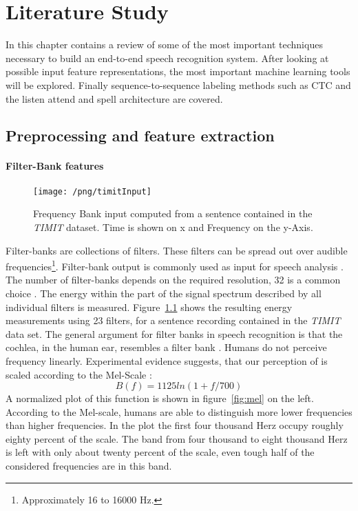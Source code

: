\chapter{Literature Study}
\label{cha:litreview}
In this chapter contains a review of some of the most important techniques necessary to build an end-to-end speech recognition system. After looking at possible input feature representations, the most important machine learning tools will be explored. Finally sequence-to-sequence labeling methods such as CTC and the listen attend and spell architecture are covered.

\section{Preprocessing and feature extraction}
\subsubsection{Filter-Bank features}
\begin{figure}
\centering
\texttt{[image: /png/timitInput]}
\caption{Frequency Bank input computed from a sentence contained in the \textit{TIMIT} dataset. Time is shown on x and Frequency on the y-Axis.}
\label{fig:timitInput}
\end{figure}
Filter-banks are collections of filters. These filters can be spread out over audible frequencies\footnote{Approximately 16 to 16000 Hz.}. Filter-bank output is commonly used as input for speech analysis \cite{Huang2001}\cite{Chan2015}. The number of filter-banks depends on the required resolution, 32 is a common choice \cite{Juang1987}. The energy within the part of the signal spectrum described by all individual filters is measured. Figure~\ref{fig:timitInput} shows the resulting energy measurements using 23 filters, for a sentence recording contained in the \textit{TIMIT} data set.
The general argument for filter banks in speech recognition is that the cochlea, in the human ear, resembles a filter bank \cite[page 30]{Huang2001}. Humans do not perceive frequency linearly. Experimental evidence suggests, that our perception of is scaled according to the Mel-Scale \cite[page 34]{Huang2001}:
\begin{equation}
B(f) = 1125 ln(1 + f / 700)
\end{equation}
A normalized plot of this function is shown in figure~\ref{fig:mel} on the left.
According to the Mel-scale, humans are able to distinguish more lower frequencies than higher frequencies. In the plot the first four thousand Herz occupy roughly eighty percent of the scale. The band from four thousand to eight thousand Herz is left with only about twenty percent of the scale, even tough half of the considered frequencies are in this band.
